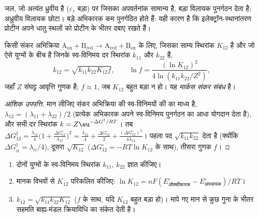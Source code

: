 \admitted

जल, जो अत्यंत ध्रुवीय है ($\varepsilon_s$ बड़ा) पर जिसका अपवर्तनांक सामान्य है, बड़ा
विलायक पुनर्गठन देता है; अध्रुवीय विलायक छोटा। बड़े अभिकारक
कम पुनर्गठित होते हैं: यही कारण है कि इलेक्ट्रॉन-स्थानांतरण प्रोटीन अपने धातु स्थलों को
प्रोटीन के भीतर दबाए रखते हैं।

\begin{theorem}[मार्कस संकर संबंध]\label{thm:b3:complex-mechanisms:cross-relation}
किसी संकर अभिक्रिया $\mathrm{A_{ox} + B_{red} \to A_{red} + B_{ox}}$ के लिए, जिसका साम्य स्थिरांक $K_{12}$ है और जो ऐसे युग्मों के बीच है
जिनके स्व-विनिमय दर स्थिरांक $k_{11}$ और $k_{22}$ हैं,
\[
  k_{12} = \sqrt{k_{11}k_{22}K_{12}f}, \qquad \ln f = \frac{(\ln K_{12})^2}{4\ln(k_{11}k_{22}/Z^2)},
\]
जहाँ $Z$ संघट्ट आवृत्ति गुणक है; $f \approx 1$, जब $K_{12}$ बहुत बड़ा न हो। यह
\emph{मार्कस संकर संबंध} है।
\end{theorem}

\begin{proof}[आंशिक उपपत्ति]
मान लीजिए संकर अभिक्रिया की  स्व-विनिमयों की  का
माध्य है, $\lambda_{12} = (\lambda_{11} + \lambda_{22})/2$ (प्रत्येक अभिकारक अपने स्व-विनिमय
पुनर्गठन का आधा योगदान देता है), और सभी दर स्थिरांक $k = Z\eu^{-\Delta G^{\ddagger}/RT}$। तब
$\Delta G_{12}^{\ddagger} = \frac{\lambda_{12}}{4}\bigl(1 + \frac{\Delta G^\circ_{12}}{\lambda_{12}}\bigr)^2 = \frac{\lambda_{12}}{4} + \frac{\Delta G^\circ_{12}}{2} + \frac{(\Delta G^\circ_{12})^2}{4\lambda_{12}}$। पहला पद
$\sqrt{k_{11}k_{22}}$ देता है (क्योंकि $\Delta G^{\ddagger}_{ii} = \lambda_{ii}/4$), दूसरा $\sqrt{K_{12}}$ ($\Delta G^\circ_{12} = -RT\ln K_{12}$ के साथ), तीसरा
गुणक $f$।
\end{proof}

\begin{method}[स्व-विनिमय आँकड़ों से संकर-अभिक्रिया दर]\label{met:b3:complex-mechanisms:marcus-estimate}
\begin{enumerate}
  \item दोनों युग्मों के स्व-विनिमय स्थिरांक $k_{11}$, $k_{22}$ ज्ञात कीजिए।
  \item मानक विभवों से $K_{12}$ परिकलित कीजिए: $\ln K_{12} = nF(E^\circ_{\text{ऑक्सीकारक}} - E^\circ_{\text{अपचायक}})/RT$।
  \item $k_{12} = \sqrt{k_{11}k_{22}K_{12}}$ ($f$ के साथ, यदि $K_{12}$ बहुत बड़ा हो)। मापे गए मान से कुछ गुना के
        भीतर सहमति बाह्य-मंडल क्रियाविधि का संकेत देती है।
\end{enumerate}
\end{method}

